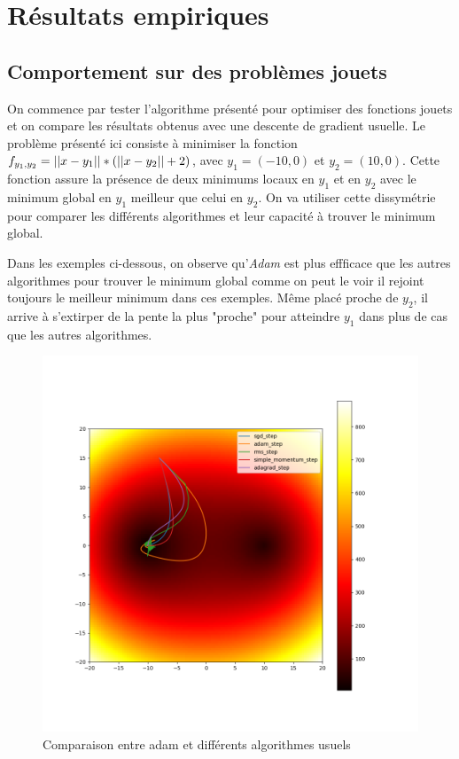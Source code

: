 \documentclass[fleqn,11pt, titlepage, french]{article}
\begin{document}
	\section{Résultats empiriques}
	
	\subsection{Comportement sur des problèmes jouets}
	
	On commence par tester l'algorithme présenté pour optimiser des fonctions jouets et on compare les résultats obtenus avec une descente de gradient usuelle. Le problème présenté ici consiste à minimiser la fonction $f_{y_1, y_2} = \left|\left|x-y_1\right|\right| * (\left|\left|x-y_2\right|\right| +2) $, avec $y_1 = (-10, 0)$ et $y_2 = (10, 0)$. Cette fonction assure la présence de deux minimums locaux en $y_1$ et en $y_2$ avec le minimum global en $y_1$ meilleur que celui en $y_2$. On va utiliser cette dissymétrie pour comparer les différents algorithmes et leur capacité à trouver le minimum global.
	
	Dans les exemples ci-dessous, on observe qu'\emph{Adam} est plus effficace que les autres algorithmes pour trouver le minimum global comme on peut le voir il rejoint toujours le meilleur minimum dans ces exemples. Même placé proche de $y_2$, il arrive à s'extirper de la pente la plus "proche" pour atteindre $y_1$ dans plus de cas que les autres algorithmes.
	
	\begin{figure}[H]
		\centering
		\includegraphics[scale=0.3]{../gdsvm/exports/adam-rms-sgd.png}
		\caption{Comparaison entre adam et différents algorithmes usuels}
	\end{figure}
\end{document}
